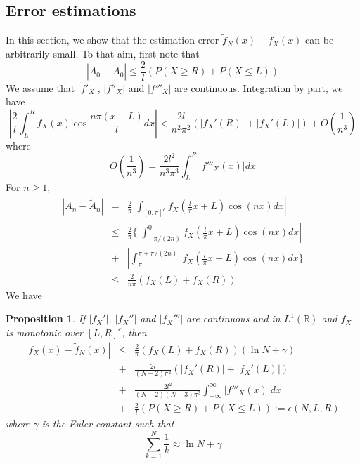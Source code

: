 \documentclass[numreferences]{kluwer}    %
\newtheorem{Prop}[Thm]{Proposition}
\begin{document}
\begin{article}
\section{Error estimations}
In this section, we show that the estimation error $\tilde f_{N}(x) - f_X(x)$ can be arbitrarily small.
To that aim, first
note that
\[
|A_0-\tilde A_0|\le \frac{2}l (P(X\ge R)+P(X\le L))
\]
We assume that $|f'_X|$, $|f''_X|$ and $|f'''_X|$ are continuous.
Integration by part, we have
\begin{equation}
|\frac2l\int^R_{L}f_X(x)\cos\frac{n\pi(x-L)}ldx|<\frac{2l}{n^2\pi^2}(|f_X'(R)|+|f_X'(L)|)
+O(\frac1{n^3})
\end{equation}
where
\[
O(\frac1{n^3})=\frac{2l^2}{n^3\pi^3}\int^R_L|f'''_X(x)|dx
\]
For $n\ge 1$,
\begin{eqnarray*}
|A_n-\tilde A_n|&=&\frac2{\pi}|\int_{[0,\pi]^c}
f_X(\frac{l}{\pi}x+L)\cos(nx)dx|\\
&\le&\frac2{\pi} \{|\int^0_{-\pi/(2n)}f_X(\frac{l}{\pi}x+L)\cos(nx)dx| \\
&+&|\int^{\pi+\pi/(2n)}_{\pi}|f_X(\frac{l}{\pi}x+L)\cos(nx)dx\}\\
&\le & \frac{2}{n\pi}(f_X(L)+f_X(R))
\end{eqnarray*}
We have
\begin{Prop} If $|f_X'|$, $|f_X''|$ and $|f_X'''|$ are continuous and in
$L^1(\mathbb{R})$ and $f_X$ is monotonic over $[L,R]^c$, then
\begin{eqnarray}
|f_X(x)-\tilde f_N(x)|&\le& \frac{2}{\pi}(f_X(L)+f_X(R))(\ln N+\gamma)\nonumber\\
&+&\frac{2l}{(N-2)\pi^2}(|f_X'(R)|+|f_X'(L)|)\nonumber\\
&+&\frac{2l^2}{(N-2)(N-3)\pi^3}\int^{\infty}_{-\infty}|f'''_X(x)|dx\nonumber\\
&+&\frac{2}l (P(X\ge R)+P(X\le L)):=\epsilon(N,L,R)\label{errorE}
\end{eqnarray}
where $\gamma$ is the Euler constant such that
\[
\sum_{k=1}^N\frac1k\approx \ln N +\gamma
\]
\end{Prop}

\end{article}
\end{document}
